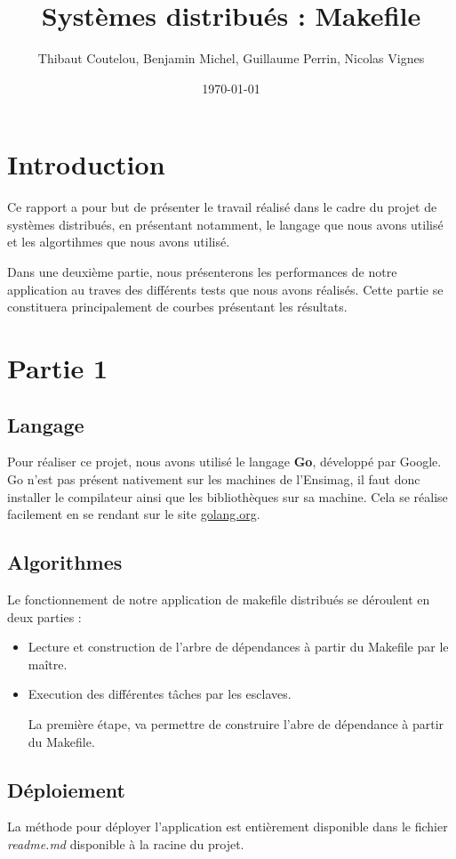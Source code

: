 \documentclass[a4paper,11pt]{article}
\title{Systèmes distribués : Makefile}
\author{Thibaut Coutelou, Benjamin Michel, Guillaume Perrin, Nicolas Vignes}
\date{\today}
\begin{document}
\maketitle

\setlength{\parskip}{2mm}

\section{Introduction}
Ce rapport a pour but de présenter le travail réalisé dans le cadre du projet de systèmes distribués, en présentant notamment, le langage que nous avons utilisé et les algortihmes que nous avons utilisé.

Dans une deuxième partie, nous présenterons les performances de notre application au traves des différents tests que nous avons réalisés. Cette partie se constituera principalement de courbes présentant les résultats.

\section{Partie 1}
\subsection{Langage}
Pour réaliser ce projet, nous avons utilisé le langage \textbf{Go}, développé par Google. Go n'est pas présent nativement sur les machines de l'Ensimag, il faut donc installer le compilateur ainsi que les bibliothèques sur sa machine. Cela se réalise facilement en se rendant sur le site \href{http://golang.org/doc/install#download}{golang.org}.

\subsection{Algorithmes}
Le fonctionnement de notre application de makefile distribués se déroulent en deux parties :
\begin{itemize}
\item Lecture et construction de l'arbre de dépendances à partir du Makefile par le maître.
\item Execution des différentes tâches par les esclaves.

La première étape, va permettre de construire l'abre de dépendance à partir du Makefile.

\end{itemize}

\subsection{Déploiement}
La méthode pour déployer l'application est entièrement disponible dans le fichier \textit{readme.md} disponible à la racine du projet.
\end{document}
